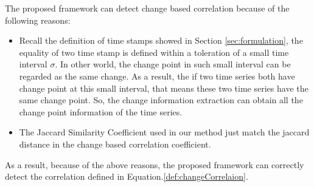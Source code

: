 The proposed framework can detect change based correlation because of the following reasons:

\begin{itemize}
  \item Recall the definition of time stamps showed in Section \ref{sec:formulation}, the equality of two time stamp is defined within a toleration of a small time interval $\sigma$. In other world, the change point in such small interval can be regarded as the same change. 
  As a result, the if two time series both have change point at this small interval, that means  these two time series have the same change point.
  So, the change information extraction can obtain all the change point information of the time series.
  \item The Jaccard Similarity Coefficient used in our method just match the jaccard distance in the change based correlation coefficient.
\end{itemize}

As a result, because of the above reasons, the proposed framework can correctly detect the correlation defined in Equation.\ref{def:changeCorrelaion}.
